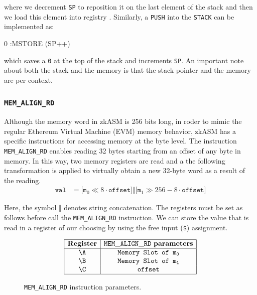 where we decrement \texttt{SP} to reposition it on the last element of the stack and
then we load this element into registry \A. Similarly, a \texttt{PUSH} into the \texttt{STACK} can be implemented as:

\begin{zkasm}
    0		:MSTORE (SP++)
\end{zkasm}

which saves a \texttt{0} at the top of the stack and increments \texttt{SP}. An important note about both the stack and the memory is that the stack pointer and the memory are per context.




\subsubsection{\texttt{MEM\_ALIGN\_RD}}

Although the memory word in zkASM is 256 bits long, in roder to mimic the regular Ethereum Virtual Machine (EVM) memory behavior, zkASM has a specific instructions for accessing memory at the byte level. The instruction \texttt{MEM\_ALIGN\_RD} enables reading 32 bytes starting from an offset of any byte in memory. In this way, two memory registers are read and a the following transformation is applied to virtually obtain a new 32-byte word as a result of the reading.
\begin{align*}
\texttt{val} &= \Bigr[ \texttt{m}_0 \ll 8 \cdot \texttt{offset} \Bigr] \mathbin\Vert \Bigr[ \texttt{m}_1 \gg 256- 8 \cdot \texttt{offset} \Bigr] 
\end{align*}

Here, the symbol $\mathbin\Vert$ denotes string concatenation. The registers must be set as follows before call the \texttt{MEM\_ALIGN\_RD} instruction. We can store the value that is read in a register of our choosing by using the free input (\texttt{\$}) assignment.


\begin{figure}[h!]
\renewcommand{\figurename}{Table}
\[
\begin{array}{|c|c|}
\hline
\mathbf{Register} &\mathtt{MEM\_ALIGN\_RD} \ \mathbf{parameters} \\ \hline
\A & \texttt{Memory Slot of } \mathtt{m_0} \\
\B & \texttt{Memory Slot of } \mathtt{m_1} \\
\C & \texttt{offset} \\
\hline
\end{array}
\]
\caption{\texttt{MEM\_ALIGN\_RD} instruction parameters.}
\label{tab:memory-first-example}
\end{figure}

